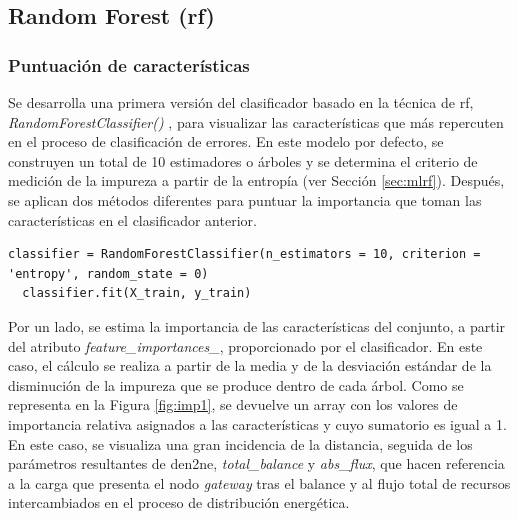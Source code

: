 \subsection{Random Forest (\acrshort{rf})}
\label{sec:rf}

\subsubsection{Puntuación de características}
\label{sec:rf1}

Se desarrolla una primera versión del clasificador basado en la técnica de \gls{rf}, \textit{RandomForestClassifier()} \cite{rfsklearn}, para visualizar las características que más repercuten en el proceso de clasificación de errores. En este modelo por defecto, se construyen un total de 10 estimadores o árboles y se determina el criterio de medición de la impureza a partir de la entropía (ver Sección \ref{sec:mlrf}). Después, se aplican dos métodos diferentes para puntuar la importancia que toman las características en el clasificador anterior. 

\vspace{3mm}

\begin{lstlisting}[style=Python, caption={Clasificador RF por defecto}]
  classifier = RandomForestClassifier(n_estimators = 10, criterion = 'entropy', random_state = 0) 
  classifier.fit(X_train, y_train)
\end{lstlisting}
  
\vspace{3mm}

Por un lado, se estima la importancia de las características del conjunto, a partir del atributo \textit{feature\_importances\_}, proporcionado por el clasificador. En este caso, el cálculo se realiza a partir de la media y de la desviación estándar de la disminución de la impureza que se produce dentro de cada árbol. Como se representa en la Figura \ref{fig:imp1}, se devuelve un array con los valores de importancia relativa asignados a las características y cuyo sumatorio es igual a 1. En este caso, se visualiza una gran incidencia de la distancia, seguida de los parámetros resultantes de \gls{den2ne}, \textit{total\_balance} y \textit{abs\_flux}, que hacen referencia a la carga que presenta el nodo \textit{gateway} tras el balance y al flujo total de recursos intercambiados en el proceso de distribución energética.

\vspace{3mm}

